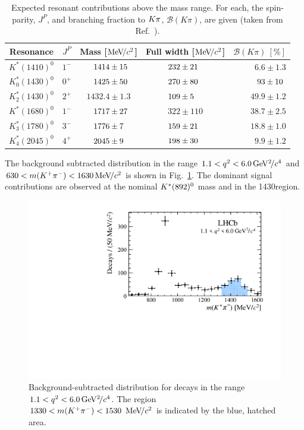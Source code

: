 \begin{table}[!tb]
\caption{Expected resonant contributions above the \KstP mass range. For each, the spin-parity, $J^P$, and branching fraction to ${K}{\pi}$, $\mathcal{B}(K\pi)$, are given (taken from Ref.~\cite{lu-wang}).}
\label{tab:introduction:states}
\centering
\begin{tabular}{c|c|c|c|r}
    Resonance & $J^{P}$ & Mass [$\mathrm{Me\kern -0.1em V\!/}c^2$] & Full width [$\mathrm{Me\kern -0.1em V\!/}c^2$]  & $\mathcal{B}(K\pi)~[\%]$ \\
   \hline
   $K^\ast(1410)^0$ & $1^{-}$& $\hphantom{0.}1414 \pm 15\hphantom{.}$& $232 \pm 21\hphantom{0}$  & $6.6 \pm 1.3$ \\
   $K^\ast_0(1430)^0$ & $0^{+}$ & $\hphantom{0.}1425 \pm 50\hphantom{.}$ & $270 \pm 80\hphantom{0}$ & $\hphantom{.}93 \pm 10\hphantom{.}$ \\
   $K^\ast_2(1430)^0$ & $2^{+}$ & $1432.4\pm 1.3$ & $109 \pm 5\hphantom{00}$ & $49.9 \pm 1.2$ \\
   $K^\ast(1680)^0$ & $1^{-}$ & $\hphantom{0.}1717 \pm 27\hphantom{.}$ & $322 \pm 110$ & $38.7 \pm 2.5$ \\
   $K^\ast_3(1780)^0$ & $3^{-}$ & $\hphantom{0.}1776 \pm 7\hphantom{0.}$ & $159 \pm 21\hphantom{0}$ & $18.8 \pm 1.0$ \\
   $K^\ast_4(2045)^0$ & $4^{+}$ & $\hphantom{0.}2045 \pm 9\hphantom{0.}$ & $198 \pm 30\hphantom{0}$ & $9.9 \pm 1.2$ \\
 \end{tabular}
 \end{table}

The background subtracted \mkpi distribution in the range $1.1<{q^2}<6.0{\mathrm{\,Ge\kern -0.1em V^2\!/}c^4}$ and $630<m({{K}^+}{{\pi}^-})<1630{\mathrm{\,Me\kern -0.1em V\!/}c^2}$ is shown in Fig.~\ref{fig:full-mkpi}. The dominant signal contributions are observed at the nominal ${{K}^*}(892)^{0}$ mass and in the 1430\mevcc region. 

\begin{figure}[!tb]
 \centering
 \includegraphics[width=0.7\linewidth]{figs/kpimm/introduction/full-mkpi.pdf}
 \caption{Background-subtracted \mkpi distribution for \BdToKpimm decays in the range $1.1<{q^2}<6.0{\mathrm{\,Ge\kern -0.1em V^2\!/}c^4}$. The region $1330<m({{K}^+}{{\pi}^-})<1530~{\mathrm{\,Me\kern -0.1em V\!/}c^2}$ is indicated by the blue, hatched area.}
\label{fig:full-mkpi}
\end{figure}

